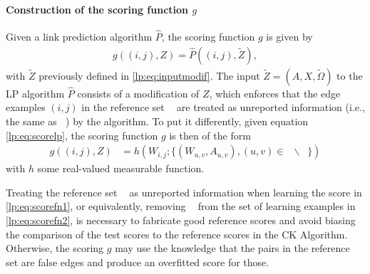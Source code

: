 \documentclass[a4paper, 11pt]{article}
\theoremstyle{remark}
\DeclareMathOperator{\Dtr}{\cD_{\text{train}}}
\DeclareMathOperator{\Dcal}{\cD_{\text{cal}}}
\DeclareMathOperator{\Dtest}{\cD_{\text{test}}}
\newcommand{\EM}{\ensuremath}
\newcommand{\cD}{\EM{\mathcal{D}}}
\begin{document}
\paragraph{Construction of the scoring function $g$} Given a link prediction algorithm $\hat P$, the scoring function $g$ is given by
\begin{align} \label{lp:eq:scorefn1}
g((i,j), Z) = \hat P((i,j), \tilde Z), %
\end{align}
with $\tilde Z$ previously defined in \eqref{lp:eq:inputmodif}. The input $\tilde Z = (A, X, \tilde \Omega)$ to the LP algorithm $\hat P$ consists of a modification of $Z$, which enforces that the edge examples $(i,j)$ in the reference set $\Dcal$ are treated as unreported information (i.e., the same as $\Dtest$) by the algorithm.
To put it differently, given equation \eqref{lp:eq:scorelp}, the scoring function $g$ is then of the form
\begin{align} \label{lp:eq:scorefn2}
g((i,j), Z) &= h( W_{i,j}; \{(W_{u,v}, A_{u,v}), (u,v) \in \Dtr \backslash \Dcal \}) 
\end{align}
with $h$ some real-valued measurable function. 


Treating the reference set $\Dcal$ as unreported information when learning the score in \eqref{lp:eq:scorefn1}, or equivalently, removing $\Dcal$ from the set of learning examples in \eqref{lp:eq:scorefn2}, is necessary to fabricate good reference scores and avoid biasing the comparison of the test scores to the reference scores in the CK Algorithm. Otherwise, the scoring $g$ may use the knowledge that the pairs in the reference set are false edges and produce an overfitted score for those. 

\end{document}
